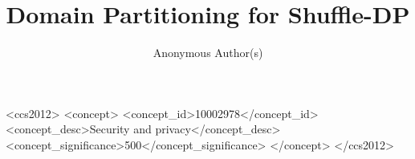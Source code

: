 \documentclass[sigconf, review]{acmart}
\theoremstyle{definition}
\theoremstyle{definition}  %
\begin{document}
\title{Domain Partitioning for Shuffle-DP}
\author{Anonymous Author(s)}




\begin{abstract}
\end{abstract}


\begin{CCSXML}
<ccs2012>
   <concept>
       <concept_id>10002978</concept_id>
       <concept_desc>Security and privacy</concept_desc>
       <concept_significance>500</concept_significance>
       </concept>
 </ccs2012>
\end{CCSXML}




\maketitle
















\clearpage







\end{document}

